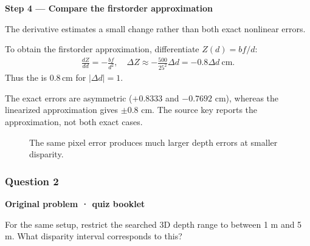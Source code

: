 \documentclass[letterpaper,11pt,english,openany,oneside]{jupyterBook}
\begin{document}
\par\medskip{}
{\color{QuizStepRed}\bfseries Step 4 — Compare the first\sphinxhyphen{}order approximation}\par\smallskip

\sphinxAtStartPar
{} The derivative estimates a small change rather than both exact nonlinear errors.

\sphinxAtStartPar
To obtain the first\sphinxhyphen{}order approximation, differentiate {\color{QuizMathBlue} \(Z(d)=bf/d\)}:
{\color{QuizMathBlue} \begin{equation*}
\begin{split}
\frac{dZ}{dd}=-\frac{bf}{d^2},\quad \Delta Z\approx-\frac{500}{25^2}\Delta d=-0.8\Delta d\ \mathrm{cm}.
\end{split}
\end{equation*}}
\sphinxAtStartPar
Thus the  is {\color{QuizMathBlue} \(\boxed{0.8\,\mathrm{cm}}\)} for {\color{QuizMathBlue} \(|\Delta d|=1\)}.

\par

\sphinxAtStartPar
{} The exact errors are asymmetric (\(+0.8333\) and \(-0.7692\) cm), whereas the linearized approximation gives \(\pm0.8\) cm. The source key reports the approximation, not both exact cases.

\begin{figure}[H]
\centering
\capstart

\noindent{}
\caption{The same pixel error produces much larger depth errors at smaller disparity.}\label{\detokenize{lectures/lecture04/quiz-workbook:id9}}\end{figure}


\subsubsection{Question 2}
\label{\detokenize{lectures/lecture04/quiz-workbook:quiz-4-q2}}\label{\detokenize{lectures/lecture04/quiz-workbook:ex-lec04-search}}\label{\detokenize{lectures/lecture04/quiz-workbook:id4}}
\par\medskip\textbf{Original problem · quiz booklet}\par\smallskip

\sphinxAtStartPar
For the same setup, restrict the searched 3D depth range to between 1 m and 5 m. What disparity interval corresponds to this?
\end{document}
